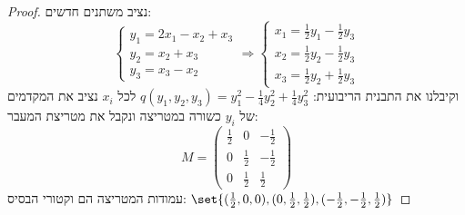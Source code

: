 \documentclass{article}
\DeclarePairedDelimiter\set\{\}
\begin{document}
\begin{proof}
    נציב משתנים חדשים:
    \[
    \begin{cases}
        y_1 = 2x_1 - x_2 + x_3 \\
        y_2 = x_2 + x_3 \\
        y_3 = x_3 - x_2
    \end{cases} \Rightarrow
    \begin{cases}
        x_1 = \frac{1}{2}y_1 - \frac{1}{2}y_3 \\
        x_2 = \frac{1}{2}y_2 - \frac{1}{2}y_3 \\
        x_3 = \frac{1}{2}y_2 + \frac{1}{2}y_3
    \end{cases}
    \]
    וקיבלנו את התבנית הריבועית: $q(y_1, y_2, y_3) = y_1^2 - \frac{1}{4}y_2^2 + \frac{1}{4}y_3^2$
    לכל $x_i$ נציב את המקדמים של $y_i$ כשורה במטריצה ונקבל את מטריצת המעבר:
    \[
    M =
    \begin{pmatrix}
        \frac{1}{2} & 0 & - \frac{1}{2} \\
        0 & \frac{1}{2} & - \frac{1}{2} \\
        0 & \frac{1}{2} & \frac{1}{2}
    \end{pmatrix}
    \]
    עמודות המטריצה הם וקטורי הבסיס: $\set{(\frac{1}{2}, 0, 0), (0, \frac{1}{2}, \frac{1}{2}), (-\frac{1}{2}, -\frac{1}{2}, \frac{1}{2})}$
    \end{proof}
\end{document}
